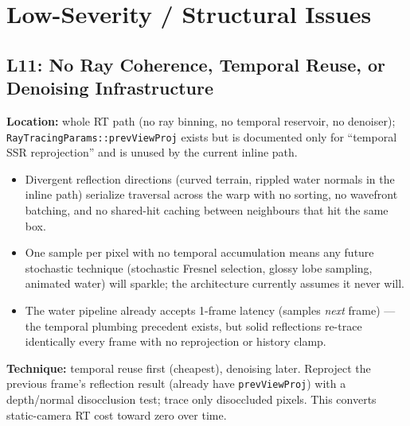 \documentclass[11pt,a4paper]{article}
\begin{document}
\section{Low-Severity / Structural Issues}

\subsection{L11: No Ray Coherence, Temporal Reuse, or Denoising Infrastructure}

\textbf{Location:} whole RT path (no ray binning, no temporal reservoir, no denoiser); \texttt{RayTracingParams::prevViewProj} exists but is documented only for ``temporal SSR reprojection'' and is unused by the current inline path.

\begin{itemize}
    \item Divergent reflection directions (curved terrain, rippled water normals in the inline path) serialize traversal across the warp with no sorting, no wavefront batching, and no shared-hit caching between neighbours that hit the same box.
    \item One sample per pixel with no temporal accumulation means any future stochastic technique (stochastic Fresnel selection, glossy lobe sampling, animated water) will sparkle; the architecture currently assumes it never will.
    \item The water pipeline already accepts 1-frame latency (samples \textit{next} frame) --- the temporal plumbing precedent exists, but solid reflections re-trace identically every frame with no reprojection or history clamp.
\end{itemize}

\textbf{Technique:} temporal reuse first (cheapest), denoising later. Reproject the previous frame's reflection result (already have \texttt{prevViewProj}) with a depth/normal disocclusion test; trace only disoccluded pixels. This converts static-camera RT cost toward zero over time.
\end{document}

